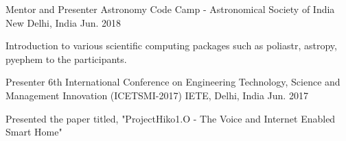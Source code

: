 


\begin{cventries}


\cventry
{Mentor and Presenter} %
{Astronomy Code Camp - Astronomical Society of India} %
{New Delhi, India} %
{Jun. 2018} %
{ %
\begin{cvitems}
\item {Introduction to various scientific computing packages such as poliastr, astropy, pyephem to the participants.}
\end{cvitems}
}


\cventry
{Presenter} %
{6th International Conference on Engineering Technology, Science and Management Innovation (ICETSMI-2017)} %
{IETE, Delhi, India} %
{Jun. 2017} %
{ %
\begin{cvitems}
\item {Presented the paper titled, "ProjectHiko1.O - The Voice and Internet Enabled Smart Home"}
\end{cvitems}
}


\end{cventries}